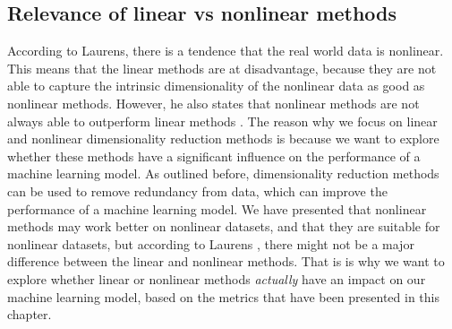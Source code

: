 \subsection{Relevance of linear vs nonlinear methods}
According to Laurens, there is a tendence that the real world data is nonlinear. This means that the linear methods are at disadvantage, because they are not able to capture the intrinsic dimensionality of the nonlinear data as good as nonlinear methods. However, he also states that nonlinear methods are not always able to outperform linear methods \cite{dimensionality-reduction-comparative-review}. The reason why we focus on linear and nonlinear dimensionality reduction methods is because we want to explore whether these methods have a significant influence on the performance of a machine learning model. As outlined before, dimensionality reduction methods can be used to remove redundancy from data, which can improve the performance of a machine learning model. We have presented that nonlinear methods may work better on nonlinear datasets, and that they are suitable for nonlinear datasets, but according to Laurens \cite{dimensionality-reduction-comparative-review}, there might not be a major difference between the linear and nonlinear methods. That is is why we want to explore whether linear or nonlinear methods \textit{actually} have an impact on our machine learning model, based on the metrics that have been presented in this chapter.





